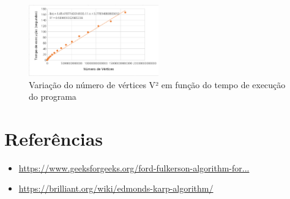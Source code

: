 \documentclass[12pt,a4paper]{article}
\begin{document}
\begin{figure}[h]
			\centering
			\includegraphics[width=0.5\textwidth]{graph}
			\caption{Variação do número de vértices {V}² em função do tempo de execução do programa}
			\label{g1}
\end{figure}

\section{Referências}
\begin{itemize}
	\item \href{https://www.geeksforgeeks.org/ford-fulkerson-algorithm-for-maximum-flow-problem/}{https://www.geeksforgeeks.org/ford-fulkerson-algorithm-for...}
	\item \href{https://brilliant.org/wiki/edmonds-karp-algorithm/}{https://brilliant.org/wiki/edmonds-karp-algorithm/}
\end{itemize}
\end{document}
